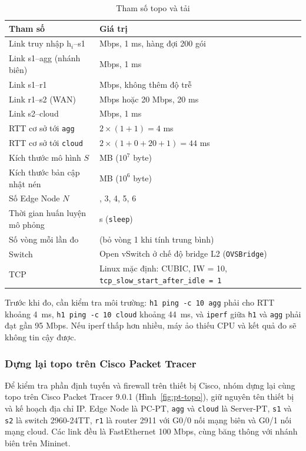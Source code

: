\begin{table}[H]
    \centering
    \caption{Tham số topo và tải}
    \label{tab:params}
    \begin{tabularx}{\textwidth}{l >{\raggedright\arraybackslash}X}
        \toprule
        \textbf{Tham số} & \textbf{Giá trị} \\
        \midrule
        Link truy nhập h$_i$--s1 & 100 Mbps, 1 ms, hàng đợi 200 gói \\
        Link s1--agg (nhánh biên) & 100 Mbps, 1 ms \\
        Link s1--r1 & 100 Mbps, không thêm độ trễ \\
        Link r1--s2 (WAN) & 100 Mbps hoặc 20 Mbps, 20 ms \\
        Link s2--cloud & 100 Mbps, 1 ms \\
        RTT cơ sở tới \texttt{agg} & $2 \times (1+1) = 4$ ms \\
        RTT cơ sở tới \texttt{cloud} & $2 \times (1+0+20+1) = 44$ ms \\
        Kích thước mô hình $S$ & 10 MB ($10^7$ byte) \\
        Kích thước bản cập nhật nén & 1 MB ($10^6$ byte) \\
        Số Edge Node $N$ & 2, 3, 4, 5, 6 \\
        Thời gian huấn luyện mô phỏng & 1 s (\texttt{sleep}) \\
        Số vòng mỗi lần đo & 10 (bỏ vòng 1 khi tính trung bình) \\
        Switch & Open vSwitch ở chế độ bridge L2 (\texttt{OVSBridge}) \\
        TCP & Linux mặc định: CUBIC, IW = 10, \nolinkurl{tcp_slow_start_after_idle = 1} \\
        \bottomrule
    \end{tabularx}
\end{table}

Trước khi đo, cần kiểm tra môi trường: \texttt{h1 ping -c 10 agg} phải cho RTT khoảng 4~ms, \texttt{h1 ping -c 10 cloud} khoảng 44~ms, và \texttt{iperf} giữa \texttt{h1} và \texttt{agg} phải đạt gần 95 Mbps. Nếu iperf thấp hơn nhiều, máy ảo thiếu CPU và kết quả đo sẽ không tin cậy được.

\subsubsection{Dựng lại topo trên Cisco Packet Tracer}
Để kiểm tra phần định tuyến và firewall trên thiết bị Cisco, nhóm dựng lại cùng topo trên Cisco Packet Tracer 9.0.1 (Hình~\ref{fig:pt-topo}), giữ nguyên tên thiết bị và kế hoạch địa chỉ IP. Edge Node là PC-PT, \texttt{agg} và \texttt{cloud} là Server-PT, \texttt{s1} và \texttt{s2} là switch 2960-24TT, \texttt{r1} là router 2911 với G0/0 nối mạng biên và G0/1 nối mạng cloud. Các link đều là FastEthernet 100 Mbps, cùng băng thông với nhánh biên trên Mininet.

